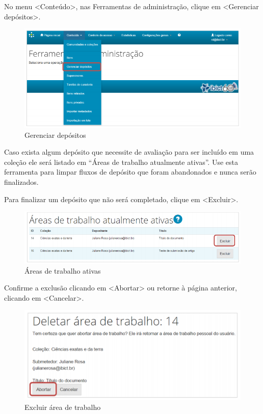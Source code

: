 \documentclass[12pt,hidelinks]{article}
\begin{document}
    \singlespacing
    
    No menu <Conteúdo>, nas Ferramentas de administração, clique em <Gerenciar depósitos>.
    
    \begin{figure}[!htp]
                \centering
                \includegraphics[scale=0.8]{figura/Figura116.png}
                \caption{Gerenciar depósitos}
            \label{Rotulo}
        \end{figure}
    
    Caso exista algum depósito que necessite de avaliação para ser incluído em uma coleção ele será listado em “Áreas de trabalho atualmente ativas”. Use esta ferramenta para limpar fluxos de depósito que foram abandonados e nunca serão finalizados.
    
    \singlespacing
    
    Para finalizar um depósito que não será completado, clique em <Excluir>.
    
    \begin{figure}[!htp]
                \centering
                \includegraphics[scale=0.8]{figura/Figura117.png}
                \caption{Áreas de trabalho ativas}
            \label{Rotulo}
        \end{figure}
  
\newpage

    Confirme a exclusão clicando em <Abortar> ou retorne à página anterior, clicando em <Cancelar>.
    
    \begin{figure}[!htp]
                \centering
                \includegraphics[scale=0.8]{figura/Figura118.png}
                \caption{Excluir área de trabalho}
            \label{Rotulo}
        \end{figure}
    
\end{document}
